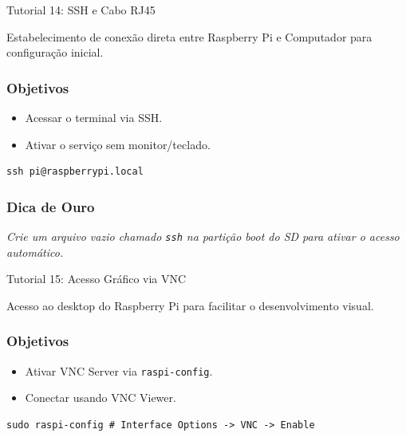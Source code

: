 \documentclass[11pt,a4paper]{article}
\begin{document}
\newpage
\begin{boxTutorial}{Tutorial 14: SSH e Cabo RJ45}
\label{sec: Tutorial 14: Acesso Remoto SSH}

    Estabelecimento de conexão direta entre Raspberry Pi e Computador para configuração inicial.
    
    \subsubsection*{Objetivos}
    \begin{itemize}
        \item Acessar o terminal via SSH.
        \item Ativar o serviço sem monitor/teclado.
    \end{itemize}
    
    \begin{verbatim}
ssh pi@raspberrypi.local
    \end{verbatim}
    
    \subsubsection*{Dica de Ouro}
    \textit{Crie um arquivo vazio chamado \texttt{ssh} na partição boot do SD para ativar o acesso automático.}
\end{boxTutorial}



\newpage
\begin{boxTutorial}{Tutorial 15: Acesso Gráfico via VNC}
\label{sec: Tutorial 15: VNC}

    Acesso ao desktop do Raspberry Pi para facilitar o desenvolvimento visual.
    
    \subsubsection*{Objetivos}
    \begin{itemize}
        \item Ativar VNC Server via \texttt{raspi-config}.
        \item Conectar usando VNC Viewer.
    \end{itemize}
    
    \begin{verbatim}
sudo raspi-config # Interface Options -> VNC -> Enable
    \end{verbatim}
\end{boxTutorial}
\end{document}
